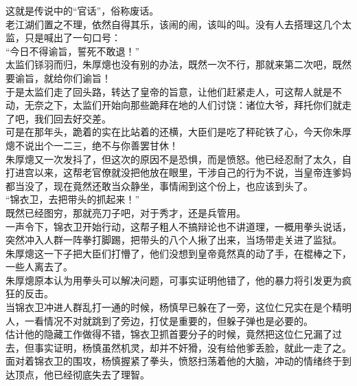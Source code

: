 \begin{multicols}{\theparacolNo}
这就是传说中的“官话”，俗称废话。\\

老江湖们置之不理，依然自得其乐，该闹的闹，该叫的叫。没有人去搭理这几个太监，只是喊出了一句口号：\\

“今日不得谕旨，誓死不敢退！”\\

太监们铩羽而归，朱厚熜也没有别的办法，既然一次不行，那就来第二次吧，既然要谕旨，就给你们谕旨！\\

于是太监们走了回头路，转达了皇帝的旨意，让他们赶紧走人，可这帮人就是不动，无奈之下，太监们开始向那些跪拜在地的人们讨饶：诸位大爷，拜托你们就走了吧，我们回去好交差。\\

可是在那年头，跪着的实在比站着的还横，大臣们是吃了秤砣铁了心，今天你朱厚熜不说出个一二三，绝不与你善罢甘休！\\

朱厚熜又一次发抖了，但这次的原因不是恐惧，而是愤怒。他已经忍耐了太久，自打进宫以来，这帮老官僚就没把他放在眼里，干涉自己的行为不说，当皇帝连爹妈都当没了，现在竟然还敢当众静坐，事情闹到这个份上，也应该到头了。\\

“锦衣卫，去把带头的抓起来！”\\

既然已经图穷，那就亮刀子吧，对于秀才，还是兵管用。\\

一声令下，锦衣卫开始行动，这帮子粗人不搞辩论也不讲道理，一概用拳头说话，突然冲入人群一阵拳打脚踢，把带头的八个人揪了出来，当场带走关进了监狱。\\

朱厚熜这一下子把大臣们打懵了，他们没想到皇帝竟然真的动了手，在棍棒之下，一些人离去了。\\

朱厚熜原本认为用拳头可以解决问题，可事实证明他错了，他的暴力将引发更为疯狂的反击。\\

当锦衣卫冲进人群乱打一通的时候，杨慎早已躲在了一旁，这位仁兄实在是个精明人，一看情况不对就跳到了旁边，打仗是重要的，但躲子弹也是必要的。\\

估计他的隐藏工作做得不错，锦衣卫抓首要分子的时候，竟然把这位仁兄漏了过去，但事实证明，杨慎虽然机灵，却并不奸猾，没有给他爹丢脸，就此一走了之。\\

面对着锦衣卫的围攻，杨慎握紧了拳头，愤怒扫荡着他的大脑，冲动的情绪终于到达顶点，他已经彻底失去了理智。\\


\end{multicols}
